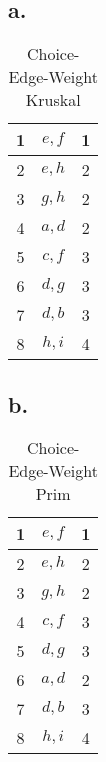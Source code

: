 \documentclass[11pt]{article}
\begin{document}
\subsection*{a.}
\begin{table}[H]
\small
\centering
\caption{ Choice-Edge-Weight Kruskal }
\label{table:Kruskal}
\begin{tabular}{|c|c|c|}	%
\hline 							%
1 & ${e,f}$& 1\\
\hline 
2 & ${e,h}$& 2\\
\hline 
3 & ${g,h}$& 2\\
\hline 
4 & ${a,d}$& 2\\
\hline 
5 & ${c,f}$& 3\\
\hline 
6 & ${d,g}$& 3\\
\hline 
7 & ${d,b}$& 3\\
\hline 
8 & ${h,i}$& 4\\
\end{tabular}
\end{table}

\subsection*{b.}
\begin{table}[H]
\small
\centering
\caption{ Choice-Edge-Weight Prim }
\label{table:Prim}
\begin{tabular}{|c|c|c|}	%
\hline 							%
1 & ${e,f}$& 1\\
\hline 
2 & ${e,h}$& 2\\
\hline 
3 & ${g,h}$& 2\\
\hline 
4 & ${c,f}$& 3\\
\hline 
5 & ${d,g}$& 3\\
\hline 
6 & ${a,d}$& 2\\
\hline 
7 & ${d,b}$& 3\\
\hline 
8 & ${h,i}$& 4\\
\end{tabular}
\end{table}
\end{document}

